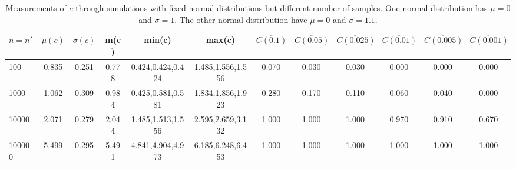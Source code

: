 \begin{table*}[h!]
\begin{center}
\begin{tabular}{| l | c | c | c | c | c | c | c | c | c | c | c |}\hline
$n=n'$ & $\mu(c)$ & $\sigma(c)$ & m(c) & min(c) & max(c) & $\overline{C(0.1)}$ & $\overline{C(0.05)}$ & $\overline{C(0.025)}$ & $\overline{C(0.01)}$ & $\overline{C(0.005)}$ & $\overline{C(0.001)}$ \\\hline
100 & 0.835 & 0.251 & 0.778 & 0.424,0.424,0.424 & 1.485,1.556,1.556  & 0.070  & 0.030  & 0.030  & 0.000  & 0.000  & 0.000 \\\hline
1000 & 1.062 & 0.309 & 0.984 & 0.425,0.581,0.581 & 1.834,1.856,1.923  & 0.280  & 0.170  & 0.110  & 0.060  & 0.040  & 0.000 \\\hline
10000 & 2.071 & 0.279 & 2.044 & 1.485,1.513,1.556 & 2.595,2.659,3.132  & 1.000  & 1.000  & 1.000  & 0.970  & 0.910  & 0.670 \\\hline
100000 & 5.499 & 0.295 & 5.491 & 4.841,4.904,4.973 & 6.185,6.248,6.453  & 1.000  & 1.000  & 1.000  & 1.000  & 1.000  & 1.000 \\\hline
\end{tabular}
\caption{Measurements of $c$ through simulations
        with fixed normal distributions but different number of samples.
        One normal distribution has $\mu=0$ and $\sigma=1$.
        The other normal distribution have $\mu=0$ and $\sigma=1.1$.}
\end{center}
\end{table*}